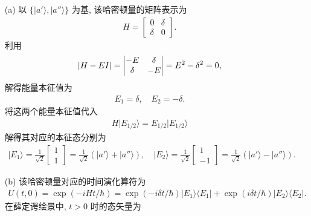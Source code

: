 \documentclass{assignment}
\begin{document}
\begin{sol}
    \begin{itemize}
        \item[(a)] 以 $\{\lvert a'\rangle,\lvert a''\rangle\}$ 为基, 该哈密顿量的矩阵表示为
        \begin{align}
            H=\begin{bmatrix}
                0&\delta\\
                \delta&0
            \end{bmatrix}.
        \end{align}
        利用
        \begin{align}
            \left\lvert H-EI\right\rvert=\begin{vmatrix}
                -E&\delta\\
                \delta&-E
            \end{vmatrix}=E^2-\delta^2=0,
        \end{align}
        解得能量本征值为
        \begin{align}
            E_1=\delta,\quad E_2=-\delta.
        \end{align}
        将这两个能量本征值代入
        \begin{align}
            H\lvert E_{1/2}\rangle=E_{1/2}\lvert E_{1/2}\rangle
        \end{align}
        解得其对应的本征态分别为
        \begin{align}
            \lvert E_1\rangle=\frac{1}{\sqrt{2}}\begin{bmatrix}
                1\\
                1
            \end{bmatrix}=\frac{1}{\sqrt{2}}(\lvert a'\rangle+\lvert a''\rangle),\quad\lvert E_2\rangle=\frac{1}{\sqrt{2}}\begin{bmatrix}
                1\\
                -1
            \end{bmatrix}=\frac{1}{\sqrt{2}}(\lvert a'\rangle-\lvert a''\rangle).
        \end{align}
        \item[(b)] 该哈密顿量对应的时间演化算符为
        \begin{align}
            U(t,0)=\exp(-iHt/\hbar)=\exp(-i\delta t/\hbar)\lvert E_1\rangle\langle E_1\rvert+\exp(i\delta t/\hbar)\lvert E_2\rangle\langle E_2\rvert.
        \end{align}
        在薛定谔绘景中, $t>0$ 时的态矢量为
        \begin{align}

\end{align}
\end{itemize}
\end{sol}
\end{document}
